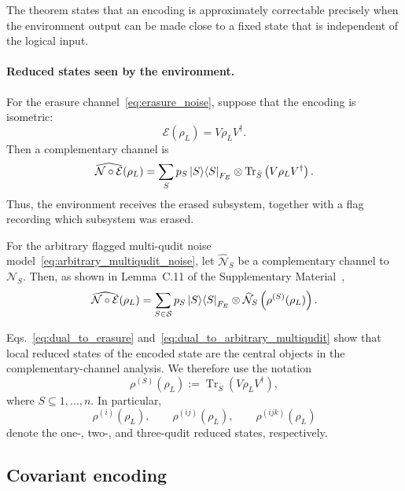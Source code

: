 \documentclass[10pt,twocolumn,superscriptaddress,aps,amsmath,amssymb,citeautoscript,floatfix,prx,longbibliography]{revtex4-2}
\theoremstyle{plain}
\theoremstyle{plain}
\theoremstyle{plain}
\theoremstyle{plain}
\theoremstyle{plain}
\theoremstyle{plain}
\begin{document}
The theorem states that an encoding is approximately correctable precisely when the environment output can be made close to a fixed state that is independent of the logical input.

\paragraph{Reduced states seen by the environment.}

For the erasure channel~\eqref{eq:erasure_noise}, suppose that the encoding is isometric:
\begin{equation}\label{eq:enc_isom}
\mathcal E(\rho_L)
=
V\rho_LV^\dagger .
\end{equation}
Then a complementary channel is~\cite{Faist2020}
\begin{equation}\label{eq:dual_to_erasure}
    \widehat{\mathcal N\circ\mathcal E}(\rho_L)
    =
    \sum_S
    p_S
    \ket S\!\bra S_{F_E}
    \otimes
    \operatorname{Tr}_{\bar S}
    \left(
        V\rho_LV^\dagger
    \right).
\end{equation}
Thus, the environment receives the erased subsystem, together with a flag recording which subsystem was erased.

For the arbitrary flagged multi-qudit noise model~\eqref{eq:arbitrary_multiqudit_noise}, let $\widehat{\mathcal N}_S$ be a complementary channel to $\mathcal N_S$. Then, as shown in Lemma~C.11 of the Supplementary Material~\cite{SuppMat},
\begin{equation}\label{eq:dual_to_arbitrary_multiqudit}
    \widehat{\mathcal N\circ\mathcal E}(\rho_L)
    =
    \sum_{S\in\mathcal S}
    p_S
    \ket S\!\bra S_{F_E}
    \otimes
    \widehat{\mathcal N}_S
    \left(
        \rho^{(S)}(\rho_L)
    \right).
\end{equation}

Eqs.~\eqref{eq:dual_to_erasure} and~\eqref{eq:dual_to_arbitrary_multiqudit} show that local reduced states of the encoded state are the central objects in the complementary-channel analysis. We therefore use the notation
\begin{equation}\label{eq:reduced_state}
\rho^{(S)}(\rho_L)
:=
\operatorname{Tr}_{\bar S}
\left(
V\rho_LV^\dagger
\right),
\end{equation}
where $S\subseteq{1,\ldots,n}$. In particular,
$$
\rho^{(i)}(\rho_L),
\qquad
\rho^{(ij)}(\rho_L),
\qquad
\rho^{(ijk)}(\rho_L)
$$
denote the one-, two-, and three-qudit reduced states, respectively.

\subsection{Covariant encoding}\label{subsec:main_covar_enc}
\end{document}
